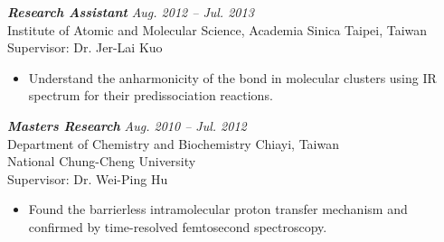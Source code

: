 {\sl \bf Research Assistant} \hfill \textit{Aug. 2012 --  Jul. 2013} \\
Institute of Atomic and Molecular Science, Academia Sinica \hfill Taipei, Taiwan \\
Supervisor: Dr. Jer-Lai Kuo \\

\vspace{-10pt}
\begin{itemize} %
    \item Understand the anharmonicity of the  bond in molecular clusters using IR spectrum for their predissociation reactions.
\end{itemize}

{\sl \bf Masters Research} \hfill \textit{Aug. 2010 -- Jul. 2012} \\
Department of Chemistry and Biochemistry \hfill Chiayi, Taiwan \\
National Chung-Cheng University \\
Supervisor: Dr. Wei-Ping Hu \\
\vspace{-10pt}
\begin{itemize} %
    \item Found the barrierless intramolecular proton transfer mechanism and confirmed by time-resolved femtosecond spectroscopy.
\end{itemize}


\endinput